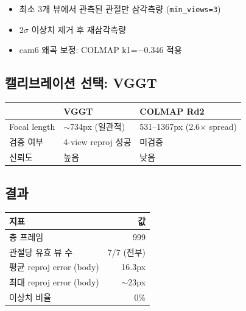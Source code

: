 \documentclass[11pt, a4paper]{article}
\begin{document}
\begin{itemize}
    \item 최소 3개 뷰에서 관측된 관절만 삼각측량 (\texttt{min\_views=3})
    \item 2$\sigma$ 이상치 제거 후 재삼각측량
    \item cam6 왜곡 보정: COLMAP k1=$-$0.346 적용
\end{itemize}

\subsection{캘리브레이션 선택: VGGT}

\begin{center}
\begin{tabular}{l l l}
\toprule
& \textbf{VGGT} & \textbf{COLMAP Rd2} \\
\midrule
Focal length & $\sim$734px (일관적) & 531--1367px (2.6$\times$ spread) \\
검증 여부 & 4-view reproj 성공 & 미검증 \\
신뢰도 & \textcolor{pass}{높음} & \textcolor{fail}{낮음} \\
\bottomrule
\end{tabular}
\end{center}

\subsection{결과}

\begin{center}
\end{center}

\begin{center}
\begin{tabular}{l r}
\toprule
\textbf{지표} & \textbf{값} \\
\midrule
총 프레임 & 999 \\
관절당 유효 뷰 수 & 7/7 (전부) \\
평균 reproj error (body) & 16.3px \\
최대 reproj error (body) & $\sim$23px \\
이상치 비율 & 0\% \\
\bottomrule
\end{tabular}
\end{center}
\end{document}
